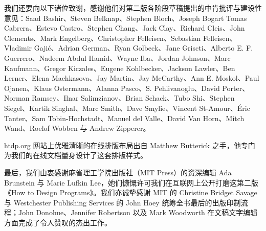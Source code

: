 我们还要向以下诸位致谢，感谢他们对第二版各阶段草稿提出的中肯批评与建设性意见：Saad Bashir、Steven Belknap、Stephen Bloch、Joseph Bogart Tomas Cabrera、Estevo Castro、Stephen Chang、Jack Clay、Richard Cleis、John Clements、Mark Engelberg、Christopher Felleisen、Sebastian Felleisen、Vladimir Gaji{\'c}、Adrian German、Ryan Golbeck、Jane Griscti、Alberto E. F. Guerrero、Nadeem Abdul Hamid、Wayne Iba、Jordan Johnson、Marc Kaufmann、Gregor Kiczales、Eugene Kohlbecker、Jackson Lawler、Ben Lerner、Elena Machkasova、Jay Martin、Jay McCarthy、Ann E. Moskol、Paul Ojanen、Klaus Ostermann、Alanna Pasco、S. Pehlivanoglu、David Porter、Norman Ramsey、Ilnar Salimzianov、Brian Schack、Tubo Shi、Stephen Siegel、Kartik Singhal、Marc Smith、Dave Smylie、Vincent St-Amour、{\'E}ric Tanter、Sam Tobin-Hochstadt、Manuel del Valle、David Van Horn、Mitch Wand、Roelof Wobben 与 Andrew Zipperer。

htdp.org 网站上优雅清晰的在线排版布局出自 Matthew Butterick 之手，他专门为我们的在线文档量身设计了这套排版样式。

最后，我们由衷感谢麻省理工学院出版社（MIT Press）的资深编辑 Ada Brunstein 与 Marie Lufkin Lee，她们慷慨许可我们在互联网上公开打磨这第二版《How to Design Programs》。我们亦诚挚感谢 MIT 的 Christine Bridget Savage 与 Westchester Publishing Services 的 John Hoey 统筹全书最后的出版印制流程；John Donohue、Jennifer Robertson 以及 Mark Woodworth 在文稿文字编辑方面完成了令人赞叹的杰出工作。
